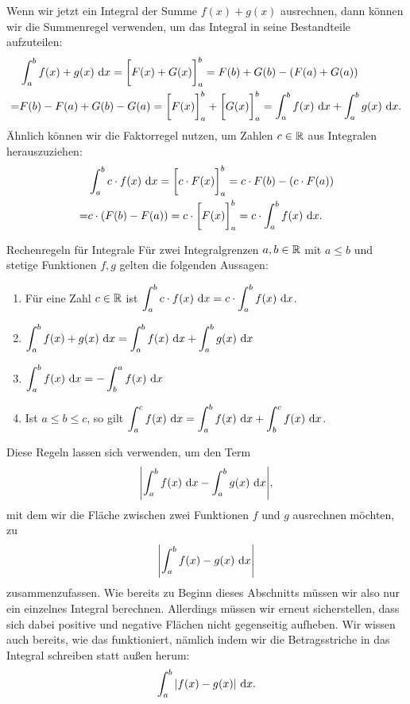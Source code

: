 \documentclass[../../main.tex]{subfiles}
\begin{document}
Wenn wir jetzt ein Integral der Summe $f(x)+g(x)$ ausrechnen, dann können
wir die Summenregel verwenden, um das Integral in seine Bestandteile aufzuteilen:
\begin{align*}
    &\int_a^bf(x)+g(x)\mathop{}\mathrm{d} x=\biggl[F(x)+G(x)\biggr]_a^b=F(b)+G(b)-(F(a)+G(a))\\
    =&F(b)-F(a)+G(b)-G(a)=\biggl[F(x)\biggr]_a^b+\biggl[G(x)\biggr]_a^b=\int_a^bf(x)\mathop{}\mathrm{d} x+\int_a^bg(x)\mathop{}\mathrm{d} x.
\end{align*}
Ähnlich können wir die Faktorregel nutzen, um Zahlen $c\in\mathbb{R}$ aus Integralen herauszuziehen:
\begin{align*}
    &\int_a^bc\cdot f(x)\mathop{}\mathrm{d} x=\biggl[c\cdot F(x)\biggr]_a^b=c\cdot F(b)-(c\cdot F(a))\\
    =&c\cdot (F(b)-F(a))=c\cdot \biggl[F(x)\biggr]_a^b=c\cdot \int_a^bf(x)\mathop{}\mathrm{d} x.
\end{align*}
\begin{theorem}{Rechenregeln für Integrale}
    Für zwei Integralgrenzen $a,b\in\mathbb{R}$ mit $a\leq b$ und stetige Funktionen $f,g$ gelten die folgenden Aussagen:
    \begin{enumerate}
        \item Für eine Zahl $c\in\mathbb{R}$ ist $\displaystyle \int_a^bc\cdot f(x)\mathop{}\mathrm{d} x=c\cdot \int_a^bf(x)\mathop{}\mathrm{d} x$.
        \item $\displaystyle\int_a^bf(x)+g(x)\mathop{}\mathrm{d} x=\int_a^bf(x)\mathop{}\mathrm{d} x+\int_a^bg(x)\mathop{}\mathrm{d} x$
        \item $\displaystyle \int_a^bf(x)\mathop{}\mathrm{d} x=-\int_b^af(x)\mathop{}\mathrm{d} x$
        \item Ist $a\leq b\leq c$, so gilt $\displaystyle \int_a^cf(x)\mathop{}\mathrm{d} x=\int_a^bf(x)\mathop{}\mathrm{d} x+\int_b^cf(x)\mathop{}\mathrm{d} x$.
    \end{enumerate}
\end{theorem}
Diese Regeln lassen sich verwenden, um den Term
\[\Biggl|\int_a^bf(x)\mathop{}\mathrm{d} x-\int_a^bg(x)\mathop{}\mathrm{d} x\Biggr|,\]
mit dem wir die Fläche zwischen zwei Funktionen $f$ und $g$ ausrechnen möchten, zu
\[\Biggl|\int_a^bf(x)-g(x)\mathop{}\mathrm{d} x\Biggr|\]
zusammenzufassen. Wie bereits zu Beginn dieses Abschnitts müssen wir also nur ein einzelnes Integral berechnen. Allerdings
müssen wir erneut sicherstellen, dass sich dabei positive und negative Flächen nicht gegenseitig aufheben. Wir wissen
auch bereits, wie das funktioniert, nämlich indem wir die Betragsstriche in das Integral schreiben statt außen herum:
\[\int_a^b|f(x)-g(x)|\mathop{}\mathrm{d} x.\]
\end{document}
